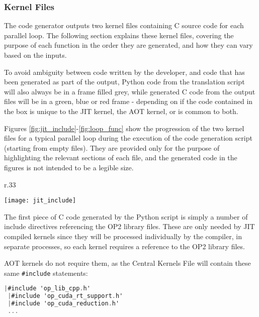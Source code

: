 \subsubsection{Kernel Files}
\label{ss:krnl_files}
The code generator outputs two kernel files containing C source code for each parallel loop. The following section explains these kernel files, covering the purpose of each function in the order they are generated, and how they can vary based on the inputs.
\par To avoid ambiguity between code written by the developer, and code that has been generated as part of the output, Python code from the translation script will also always be in a frame filled grey, while generated C code from the output files will be in a green, blue or red frame - depending on if the code contained in the box is unique to the JIT kernel, the AOT kernel, or is common to both.


\par
\noindent Figures \ref{fig:jit_include}-\ref{fig:loop_func} show the progression of the two kernel files for a typical parallel loop during the execution of the code generation script (starting from empty files). They are provided only for the purpose of highlighting the relevant sections of each file, and the generated code in the figures is not intended to be a legible size.

\clearpage
%
\begin{wrapfigure}[10]{r}{.33\textwidth}
  \centering
  \caption{Kernel Files with JIT includes}
  \label{fig:jit_include}
  \texttt{[image: jit\_include]}
\end{wrapfigure}
The first piece of C code generated by the Python script is simply a number of include directives referencing the OP2 library files. These are only needed by JIT compiled kernels since they will be processed individually by the compiler, in separate processes, so each kernel requires a reference to the OP2 library files.
\par
AOT kernels do not require them, as the Central Kernels File will contain these same \verb|#include| statements:
\begin{lstlisting}[backgroundcolor = \color{green!20}, language=C]
 |#include 'op_lib_cpp.h'
 |#include 'op_cuda_rt_support.h'
 |#include 'op_cuda_reduction.h'
 ...
\end{lstlisting}

